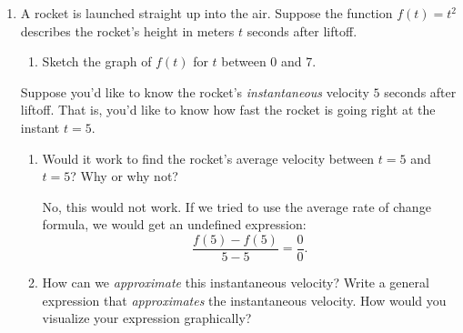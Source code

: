 \documentclass{article}
\begin{document}
\begin{enumerate}
\item  \label{def-of-derivative}


  A rocket is launched straight up into the air. Suppose the function $f(t) = t^2$ describes the rocket's height in meters $t$ seconds after liftoff.
  \begin{enumerate}
  \item \label{rocket-velocity-graph}

    \begin{problem}[2in]
      Sketch the graph of $f(t)$ for $t$ between 0 and 7. 
    \end{problem}

    \begin{solution}
    
    \end{solution}

  \end{enumerate}
  Suppose you'd like to know the rocket's \emph{instantaneous} velocity $5$ seconds after liftoff. That is, you'd like to know how fast the rocket is going right at the instant $t = 5$.
  \begin{enumerate}[resume]
  \item
    \begin{problem}[0.35in]
      Would it work to find the rocket's average velocity between $t = 5$ and $t = 5$? Why or why not?
    \end{problem}

    \begin{solution}
      No, this would not work. If we tried to use the average rate of change formula,
      we would get an undefined expression:
      \[\frac{f(5)-f(5)}{5-5}=\frac{0}{0}.\]
    \end{solution}

  \item
    \begin{problem}[\vfill]
      How can we \emph{approximate} this instantaneous velocity? Write a general expression that \emph{approximates} the instantaneous velocity. How would you visualize your expression graphically?
    \end{problem}


\end{enumerate}
\end{enumerate}
\end{document}
